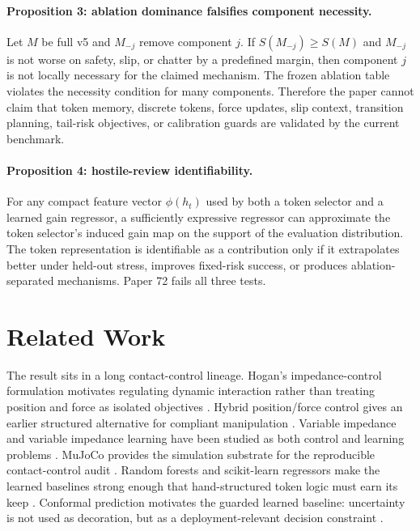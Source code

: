\documentclass{article}
\begin{document}
\paragraph{Proposition 3: ablation dominance falsifies component necessity.}
Let $M$ be full v5 and $M_{-j}$ remove component $j$.
If $S(M_{-j}) \ge S(M)$ and $M_{-j}$ is not worse on safety, slip, or chatter by a predefined margin, then component $j$ is not locally necessary for the claimed mechanism.
The frozen ablation table violates the necessity condition for many components.
Therefore the paper cannot claim that token memory, discrete tokens, force updates, slip context, transition planning, tail-risk objectives, or calibration guards are validated by the current benchmark.

\paragraph{Proposition 4: hostile-review identifiability.}
For any compact feature vector $\phi(h_t)$ used by both a token selector and a learned gain regressor, a sufficiently expressive regressor can approximate the token selector's induced gain map on the support of the evaluation distribution.
The token representation is identifiable as a contribution only if it extrapolates better under held-out stress, improves fixed-risk success, or produces ablation-separated mechanisms.
Paper 72 fails all three tests.

\section{Related Work}
The result sits in a long contact-control lineage.
Hogan's impedance-control formulation motivates regulating dynamic interaction rather than treating position and force as isolated objectives \citep{hogan1985impedance1,hogan1985impedance3}.
Hybrid position/force control gives an earlier structured alternative for compliant manipulation \citep{raibert1981hybrid}.
Variable impedance and variable impedance learning have been studied as both control and learning problems \citep{kronander2016stability,abudakka2020review,buchli2011learning}.
MuJoCo provides the simulation substrate for the reproducible contact-control audit \citep{todorov2012mujoco}.
Random forests and scikit-learn regressors make the learned baselines strong enough that hand-structured token logic must earn its keep \citep{breiman2001random,pedregosa2011scikit}.
Conformal prediction motivates the guarded learned baseline: uncertainty is not used as decoration, but as a deployment-relevant decision constraint \citep{shafer2008conformal}.
\end{document}
